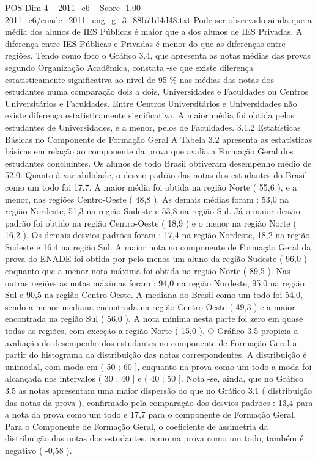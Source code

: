 \begin{textsample}{POS Dim 4 – 2011\_c6 – Score -1.00 – 2011\_c6/enade\_2011\_eng\_g\_3\_88b71d4d48.txt}
Pode ser observado ainda que a média dos alunos de IES Públicas é maior que a dos alunos de IES Privadas.
A diferença entre IES Públicas e Privadas é menor do que as diferenças entre regiões.
Tendo como foco o Gráfico 3.4, que apresenta as notas médias das provas segundo Organização Acadêmica, constata -se que existe diferença estatisticamente significativa ao nível de 95 \% nas médias das notas dos estudantes numa comparação dois a dois, Universidades e Faculdades ou Centros Universitários e Faculdades.
Entre Centros Universitários e Universidades não existe diferença estatisticamente significativa.
A maior média foi obtida pelos estudantes de Universidades, e a menor, pelos de Faculdades. 3.1.2 Estatísticas Básicas no Componente de Formação Geral A Tabela 3.2 apresenta as estatísticas básicas em relação ao componente da prova que avalia a Formação Geral dos estudantes concluintes.
Os alunos de todo Brasil obtiveram desempenho médio de 52,0.
Quanto à variabilidade, o desvio padrão das notas dos estudantes do Brasil como um todo foi 17,7.
A maior média foi obtida na região Norte ( 55,6 ), e a menor, nas regiões Centro-Oeste ( 48,8 ).
As demais médias foram : 53,0 na região Nordeste, 51,3 na região Sudeste e 53,8 na região Sul.
Já o maior desvio padrão foi obtido na região Centro-Oeste ( 18,9 ) e o menor na região Norte ( 16,2 ).
Os demais desvios padrões foram : 17,4 na região Nordeste, 18,2 na região Sudeste e 16,4 na região Sul.
A maior nota no componente de Formação Geral da prova do ENADE foi obtida por pelo menos um aluno da região Sudeste ( 96,0 ) enquanto que a menor nota máxima foi obtida na região Norte ( 89,5 ).
Nas outras regiões as notas máximas foram : 94,0 na região Nordeste, 95,0 na região Sul e 90,5 na região Centro-Oeste.
A mediana do Brasil como um todo foi 54,0, sendo a menor mediana encontrada na região Centro-Oeste ( 49,3 ) e a maior encontrada na região Sul ( 56,0 ).
A nota mínima nesta parte foi zero em quase todas as regiões, com exceção a região Norte ( 15,0 ).
O Gráfico 3.5 propicia a avaliação do desempenho dos estudantes no componente de Formação Geral a partir do histograma da distribuição das notas correspondentes.
A distribuição é unimodal, com moda em ( 50 ; 60 ], enquanto na prova como um todo a moda foi alcançada nos intervalos ( 30 ; 40 ] e ( 40 ; 50 ].
Nota -se, ainda, que no Gráfico 3.5 as notas apresentam uma maior dispersão do que no Gráfico 3.1 ( distribuição das notas da prova ), confirmado pela comparação dos desvios padrões : 13,4 para a nota da prova como um todo e 17,7 para o componente de Formação Geral.
Para o Componente de Formação Geral, o coeficiente de assimetria da distribuição das notas dos estudantes, como na prova como um todo, também é negativo ( -0,58 ).

\end{textsample}

